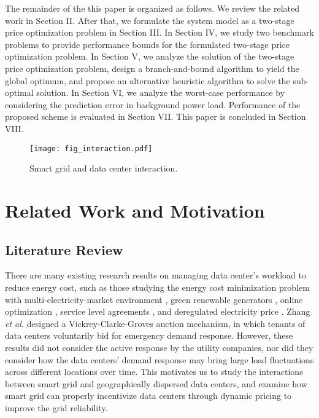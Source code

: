 \documentclass[journal]{IEEEtran}
\begin{document}
	
	The remainder of the this paper is organized as follows. We review the related work in Section II. After that, we formulate the system model as a two-stage price optimization problem in Section III. In Section IV, we study two benchmark problems to provide performance bounds for the formulated two-stage price optimization problem. In Section V, we analyze the solution of the two-stage price optimization problem, design a branch-and-bound algorithm to yield the global optimum, and propose an alternative heuristic algorithm to solve the sub-optimal solution. In Section VI, we analyze the worst-case performance by considering the prediction error in background power load. Performance of the proposed scheme is evaluated in Section VII. This paper is concluded in Section VIII.
	
	\begin{figure}[t]
		\centering
		\texttt{[image: fig\_interaction.pdf]}
		\caption{\label{fig_interaction}Smart grid and data center interaction.}
\end{figure}
	
	\section{Related Work and Motivation}
	\subsection{Literature Review}
	There are many existing research results on managing data center's workload to reduce energy cost, such as those studying the energy cost minimization problem with multi-electricity-market environment \cite{infocom}, green renewable generators \cite{sigmetrics}, online optimization \cite{online}, service level agreements \cite{SLA}, and deregulated electricity price \cite{price}. Zhang \textit{et al.} \cite{Auction} designed a Vickrey-Clarke-Groves auction mechanism, in which tenants of data centers voluntarily bid for emergency demand response. However, these results did not consider the active response by the utility companies, nor did they consider how the data centers' demand response may bring large load fluctuations across different locations over time. This motivates us to study the interactions between smart grid and geographically dispersed data centers, and examine how smart grid can properly incentivize data centers through dynamic pricing to improve the grid reliability.
	
\end{document}
